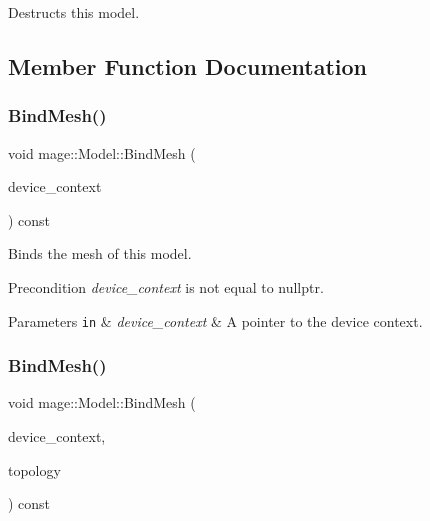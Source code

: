 Destructs this model. 

\subsection{Member Function Documentation}
\hypertarget{classmage_1_1_model_a0ee2a2b1bed4600f052af46ffcf12884}{}\label{classmage_1_1_model_a0ee2a2b1bed4600f052af46ffcf12884} 
\subsubsection{\texorpdfstring{Bind\+Mesh()}{BindMesh()}\hspace{0.1cm}{\footnotesize\ttfamily [1/2]}}
{\footnotesize\ttfamily void mage\+::\+Model\+::\+Bind\+Mesh (\begin{DoxyParamCaption}\item[{I\+D3\+D11\+Device\+Context4 $\ast$}]{device\+\_\+context }\end{DoxyParamCaption}) const\hspace{0.3cm}{\ttfamily [noexcept]}}

Binds the mesh of this model.

\begin{DoxyPrecond}{Precondition}
{\itshape device\+\_\+context} is not equal to {\ttfamily nullptr}. 
\end{DoxyPrecond}

\begin{DoxyParams}[1]{Parameters}
\mbox{\tt in}  & {\em device\+\_\+context} & A pointer to the device context. \\
\hline
\end{DoxyParams}
\hypertarget{classmage_1_1_model_a3eb8cec219dd224e302f832690324e14}{}\label{classmage_1_1_model_a3eb8cec219dd224e302f832690324e14} 
\subsubsection{\texorpdfstring{Bind\+Mesh()}{BindMesh()}\hspace{0.1cm}{\footnotesize\ttfamily [2/2]}}
{\footnotesize\ttfamily void mage\+::\+Model\+::\+Bind\+Mesh (\begin{DoxyParamCaption}\item[{I\+D3\+D11\+Device\+Context4 $\ast$}]{device\+\_\+context,  }\item[{D3\+D11\+\_\+\+P\+R\+I\+M\+I\+T\+I\+V\+E\+\_\+\+T\+O\+P\+O\+L\+O\+GY}]{topology }\end{DoxyParamCaption}) const\hspace{0.3cm}{\ttfamily [noexcept]}}

